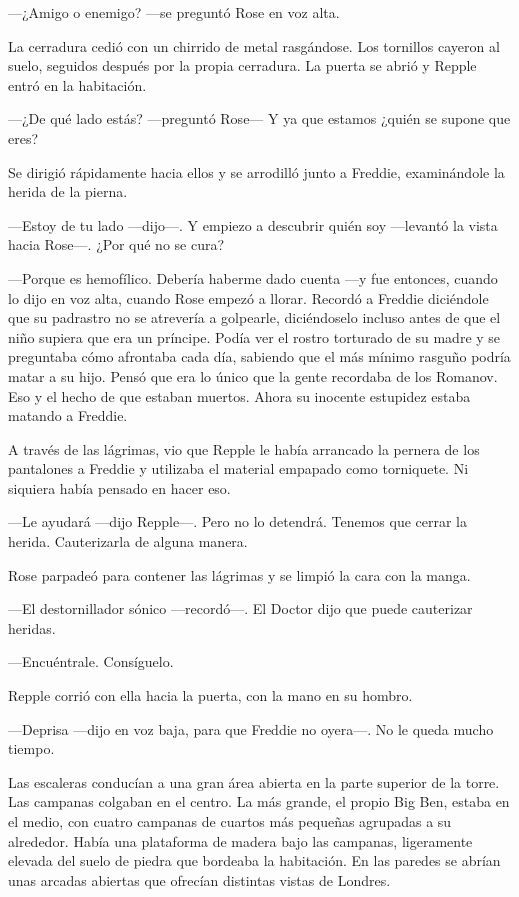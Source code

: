 {---¿Amigo o enemigo? ---se preguntó Rose en voz alta.}

{La cerradura cedió con un chirrido de metal rasgándose. Los tornillos
	cayeron al suelo, seguidos después por la propia cerradura. La puerta se
abrió y Repple entró en la habitación.}

{---¿De qué lado estás? ---preguntó Rose--- Y ya que estamos ¿quién se
supone que eres?}

{Se dirigió rápidamente hacia ellos y se arrodilló junto a Freddie,
examinándole la herida de la pierna.}

{---Estoy de tu lado ---dijo---. Y empiezo a descubrir quién soy
---levantó la vista hacia Rose---. ¿Por qué no se cura?}

{---Porque es hemofílico. Debería haberme dado cuenta ---y fue entonces,
	cuando lo dijo en voz alta, cuando Rose empezó a llorar. Recordó a
	Freddie diciéndole que su padrastro no se atrevería a golpearle,
	diciéndoselo incluso antes de que el niño supiera que era un príncipe.
	Podía ver el rostro torturado de su madre y se preguntaba cómo afrontaba
	cada día, sabiendo que el más mínimo rasguño podría matar a su hijo.
	Pensó que era lo único que la gente recordaba de los Romanov. Eso y el
	hecho de que estaban muertos. Ahora su inocente estupidez estaba matando
a Freddie.}

{A través de las lágrimas, vio que Repple le había arrancado la pernera
	de los pantalones a Freddie y utilizaba el material empapado como
torniquete. Ni siquiera había pensado en hacer eso.}

{---Le ayudará ---dijo Repple---. Pero no lo detendrá. Tenemos que
cerrar la herida. Cauterizarla de alguna manera.}

{Rose parpadeó para contener las lágrimas y se limpió la cara con la
manga.}

{---El destornillador sónico ---recordó---. El Doctor dijo que puede
cauterizar heridas.}

{---Encuéntrale. Consíguelo.}

{Repple corrió con ella hacia la puerta, con la mano en su hombro.}

{---Deprisa ---dijo en voz baja, para que Freddie no oyera---. No le
queda mucho tiempo.}

\mbox{}

{Las escaleras conducían a una gran área abierta en la parte superior de
	la torre. Las campanas colgaban en el centro. La más grande, el propio
	Big Ben, estaba en el medio, con cuatro campanas de cuartos más pequeñas
	agrupadas a su alrededor. Había una plataforma de madera bajo las
	campanas, ligeramente elevada del suelo de piedra que bordeaba la
	habitación. En las paredes se abrían unas arcadas abiertas que ofrecían
distintas vistas de Londres.}

